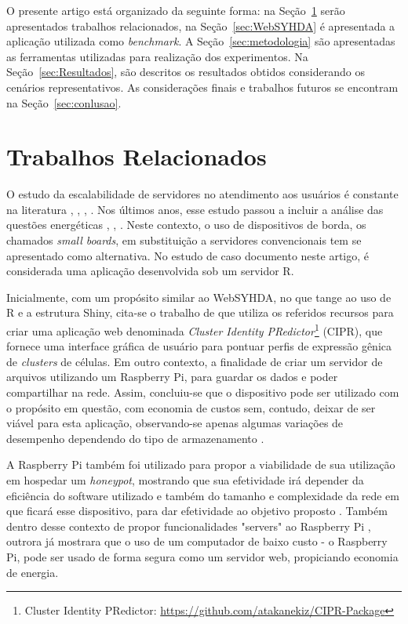 \documentclass[12pt,english,brazil]{article}
\begin{document}
O presente artigo está organizado da seguinte forma: na Seção~\ref{sec:TrabalhosRelacionados} serão apresentados trabalhos relacionados, na Seção~\ref{sec:WebSYHDA} é apresentada a aplicação utilizada como \emph{benchmark}. A Seção~\ref{sec:metodologia} são apresentadas as ferramentas utilizadas para realização dos experimentos. Na Seção~\ref{sec:Resultados}, são descritos os resultados obtidos considerando os cenários representativos. As considerações finais e trabalhos futuros se encontram na Seção~\ref{sec:conlusao}.

\section{Trabalhos Relacionados} \label{sec:TrabalhosRelacionados}

O estudo da escalabilidade de servidores no atendimento aos usuários é constante na literatura \cite{generic1}, \cite{generic5}, \cite{generic3}, \cite{generic4}. Nos últimos anos, esse estudo passou a incluir a análise das questões
energéticas \cite{generic6}, \cite{generic7}, \cite{generic8}. Neste contexto, o uso de dispositivos de borda, os chamados \emph{small
boards}, em substituição a servidores convencionais tem se apresentado como alternativa. No estudo de caso documento neste artigo, é considerada uma aplicação desenvolvida sob um servidor R.

Inicialmente, com um propósito similar ao WebSYHDA, no que tange ao uso de R e a estrutura Shiny, cita-se o  trabalho de \cite{CIPR} que utiliza os referidos recursos para criar uma aplicação web denominada \emph{Cluster Identity PRedictor}\footnote{Cluster Identity PRedictor: \url{https://github.com/atakanekiz/CIPR-Package}} (CIPR), que fornece uma interface gráfica de usuário para pontuar perfis de expressão gênica de \emph{clusters} de células.
Em outro contexto, a finalidade de criar um servidor de arquivos utilizando um Raspberry Pi, para guardar os dados e poder compartilhar na rede. Assim, concluiu-se que o dispositivo pode ser utilizado com o propósito em questão, com economia de custos sem, contudo, deixar de ser viável para esta aplicação, observando-se apenas algumas variações de desempenho dependendo do tipo de armazenamento \cite{bruschi2016teste}.

A Raspberry Pi também foi utilizado para propor a viabilidade de sua utilização em hospedar um \emph{honeypot}, mostrando que sua efetividade irá depender da eficiência do software utilizado e também do tamanho e complexidade da rede em que ficará esse dispositivo, para dar efetividade ao objetivo proposto \cite{honeypot}. Também dentro desse contexto de propor funcionalidades "servers" ao Raspberry Pi \cite{inproceedings}, outrora já mostrara que o uso de um computador de baixo custo - o Raspberry Pi, pode ser usado de forma segura como um servidor web,  propiciando economia de energia.
\end{document}
